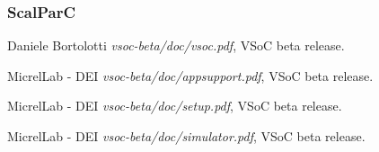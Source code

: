 \documentclass{article}
\begin{document}
\subsubsection{ScalParC}


\newpage
\begin{thebibliography}{1}

 Daniele Bortolotti {\em vsoc-beta/doc/vsoc.pdf}, \hspace{2mm} VSoC beta release.

 MicrelLab - DEI {\em  vsoc-beta/doc/appsupport.pdf}, \hspace{2mm}  VSoC beta release.

 MicrelLab - DEI {\em  vsoc-beta/doc/setup.pdf}, \hspace{2mm}  VSoC beta release.

 MicrelLab - DEI {\em  vsoc-beta/doc/simulator.pdf}, \hspace{2mm}  VSoC beta release.

\end{thebibliography}


\end{document}
